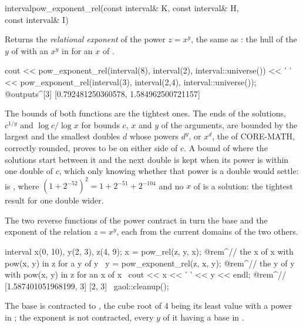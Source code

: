 \documentclass[12pt,a4paper,twoside,openright]{book}
\begin{document}
\begin{deffun}{interval}{pow\_exponent\_rel}{(const interval\& K, const interval\& H, \\\hbox{}\hfill const interval\& I)}
  \begin{operation}
  \end{operation}
  Returns the \emph{relational exponent} of the power $z=x^y$, the same
   as : the hull of the $y$ of  with an
  $x^y$ in  for an $x$ of .\newinvfive
\begin{example}
cout << pow_exponent_rel(interval(8), interval(2), interval::universe()) << ' '
     << pow_exponent_rel(interval(3), interval(2,4), interval::universe());
@outputs^[3] [0.792481250360578, 1.584962500721157]~
\end{example}
  The bounds of both functions are the tightest ones. The ends of the
  solutions, $c^{1/y}$ and $\log c/\log x$ for bounds $c$, $x$ and $y$ of
  the arguments, are bounded by the largest and the smallest doubles $d$
  whose powers $d^y$, or $x^d$, the  of CORE-MATH, correctly
  rounded, proves to be on either side of $c$. A bound of  where the
  solutions start between it and the next double is kept when its power is
  within one double of $c$, which only knowing whether that power is a
  double would settle:
   is , where
  $(1+2^{-52})^2=1+2^{-51}+2^{-104}$ and no $x$ of  is a
  solution: the tightest result for  one double wider.
\end{deffun}

\begin{Ex}\label{ex:arithmetic-pow-rel}
The two reverse functions of the power contract in turn the base and the
exponent of the relation $z=x^y$, each from the current domains of the two
others.
\begin{example}
interval x(0, 10), y(2, 3), z(4, 9);
x = pow_rel(z, y, x);            @rem^// the x of x with pow(x, y) in z for a y of y~
y = pow_exponent_rel(z, x, y);   @rem^// the y of y with pow(x, y) in z for an x of x~
cout << x << ' ' << y << endl;   @rem^// [1.587401051968199, 3] [2, 3]~
gaol::cleanup();
\end{example}
The base is contracted to , the cube root of 4
being its least value with a power in ; the exponent  is
not contracted, every $y$ of it having a base in .
\end{Ex}
\end{document}
